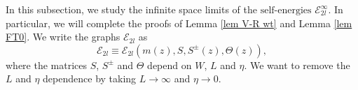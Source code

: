 \documentclass{article}
\newcommand{\1}{\mathds{1}}
\numberwithin{equation}{section}
\newcommand{\be}{\begin{equation}}
\newcommand{\ee}{\end{equation}}
\renewcommand{\cal}{\mathcal}
\renewcommand{\leq}{\leqslant}
\renewcommand{\le}{\leq}
\newcommand{\Z}{\mathbb{Z}}
\newcommand{\selfs}{\text{self-energies}}
\theoremstyle{plain} %
\newtheorem{definition}[theorem]{Definition}
\theoremstyle{remark}
\newcommand{\Sdelta}{{\Sigma}_T}
\newcommand{\wtSdelta}{\Sigma}
\newcommand{\Sele}{{\mathcal E}}
\newcommand{\Selek}{{\mathcal E}}
\newcommand{\Selekl}{{\mathcal E}^{[\eta]}}
\newcommand{\Seleinf}{{\mathcal E}^{\infty}}
\begin{document}
In this subsection, we study the infinite space limits of the $\selfs$ $\Seleinf_{2l}$. In particular, we will complete the proofs of Lemma \ref{lem V-R wt} and Lemma \ref{lem FT0}. We write the graphs $\Selek_{2l}$ as %
\be\label{defRnl} \Selek_{2l} \equiv  \Selek_{2l} \left(m(z),S, S^{\pm}(z),\Theta(z)\right), \ee
where the matrices $S$, $S^\pm$ and $\Theta$ depend on $W$, $L$ and $\eta$. We want to remove the $L$ and $\eta$ dependence by taking $L\to \infty$ and $\eta\to 0$. 
%
%
%  
\end{document}

